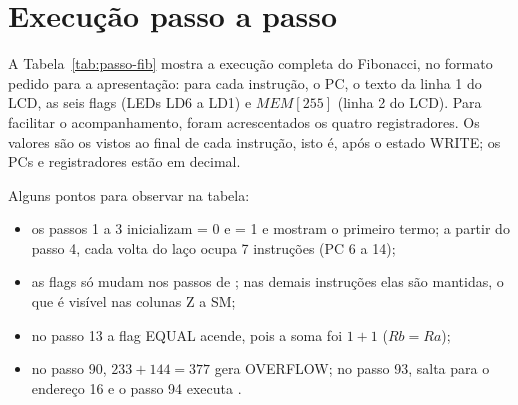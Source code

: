 \section{Execução passo a passo}
\label{sec:passo}

A Tabela~\ref{tab:passo-fib} mostra a execução completa do Fibonacci, no
formato pedido para a apresentação: para cada instrução, o PC, o texto da
linha 1 do LCD, as seis flags (LEDs LD6 a LD1) e $MEM[255]$ (linha 2 do LCD).
Para facilitar o acompanhamento, foram acrescentados os quatro registradores.
Os valores são os vistos ao final de cada instrução, isto é, após o estado
WRITE; os PCs e registradores estão em decimal.

Alguns pontos para observar na tabela:
\begin{itemize}[nosep]
  \item os passos 1 a 3 inicializam  = 0 e  = 1 e mostram o
        primeiro termo; a partir do passo 4, cada volta do laço ocupa 7
        instruções (PC 6 a 14);
  \item as flags só mudam nos passos de ; nas demais instruções
        elas são mantidas, o que é visível nas colunas Z a SM;
  \item no passo 13 a flag EQUAL acende, pois a soma foi $1 + 1$ ($Rb = Ra$);
  \item no passo 90, $233 + 144 = 377$ gera OVERFLOW; no passo 93, 
        salta para o endereço 16 e o passo 94 executa .
\end{itemize}

{\footnotesize
\setlength{\tabcolsep}{4.5pt}
\renewcommand{\arraystretch}{0.95}

}
